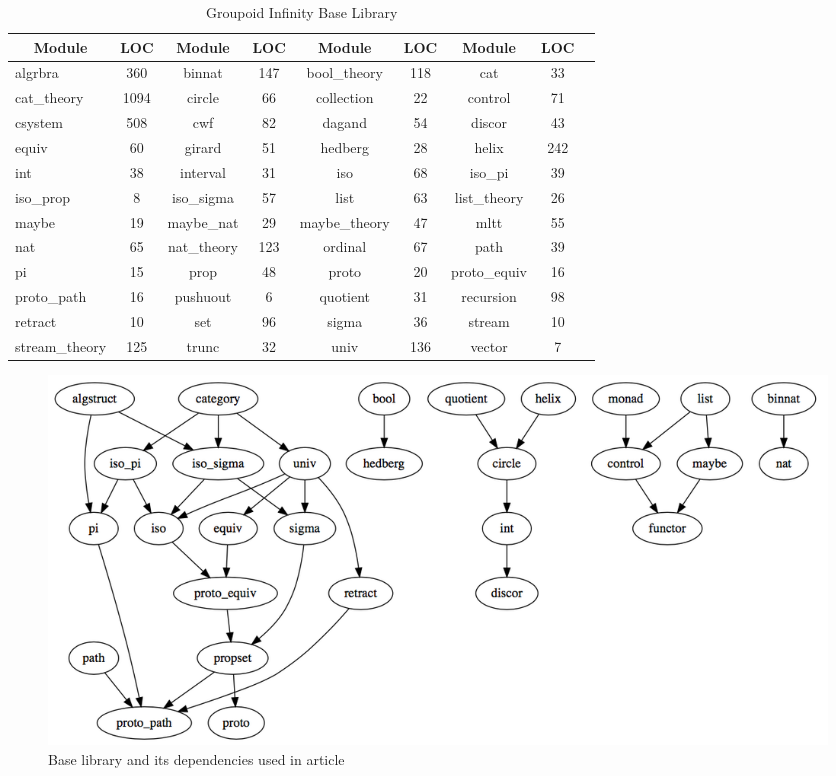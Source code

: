 \documentclass{article}
\newcommand*{\thead}[1]{\multicolumn{1}{c}{\bfseries #1}}
\begin{document}
\begin{table}[h]
\centering
\caption{Groupoid Infinity Base Library}
\label{tab:a}
\begin{tabular}{lcccccccc}
\hline
\thead{Module}&\thead{LOC}&\thead{Module}&\thead{LOC}&\thead{Module}&\thead{LOC}&\thead{Module}&\thead{LOC} \\
\hline
algrbra        & 360    & binnat         & 147 & bool\_theory   & 118    & cat            & 33  \\
cat\_theory    & 1094   & circle         & 66  & collection     & 22     & control        & 71  \\
csystem        & 508    & cwf            & 82  & dagand         & 54     & discor         & 43  \\
equiv          & 60     & girard         & 51  & hedberg        & 28     & helix          & 242 \\
int            & 38     & interval       & 31  & iso            & 68     & iso\_pi        & 39  \\
iso\_prop      & 8      & iso\_sigma     & 57  & list           & 63     & list\_theory   & 26  \\
maybe          & 19     & maybe\_nat     & 29  & maybe\_theory  & 47     & mltt           & 55  \\
nat            & 65     & nat\_theory    & 123 & ordinal        & 67     & path           & 39  \\
pi             & 15     & prop           & 48  & proto          & 20     & proto\_equiv   & 16  \\
proto\_path    & 16     & pushuout       & 6   & quotient       & 31     & recursion      & 98  \\
retract        & 10     & set            & 96  & sigma          & 36     & stream         & 10  \\
stream\_theory & 125    & trunc          & 32  & univ           & 136    & vector         & 7   \\
\hline
\end{tabular}
\end{table}

\begin{figure}[h]
  \centerline{\includegraphics[scale=0.36]{baselib}}
  \caption{Base library and its dependencies used in article}
\end{figure}

\newpage


\end{document}
